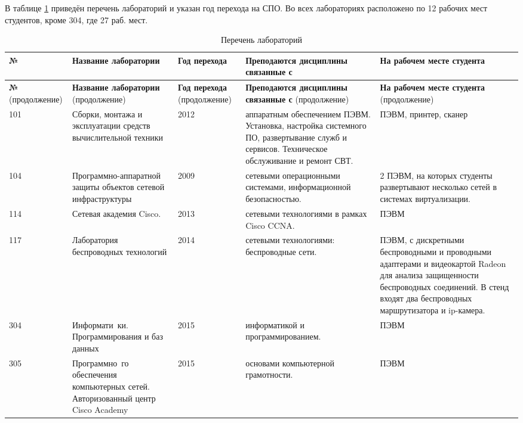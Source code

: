 \documentclass[10pt, a5paper]{article}
\begin{document}
В таблице \ref{Uymin1} приведён перечень лабораторий и указан год перехода на СПО. Во всех лабораториях расположено по 12 рабочих мест студентов, кроме 304, где 27 раб. мест.


\begin{longtable}[h!]{|p{0.7cm}|p{2cm}|p{1cm}|p{2.5cm}|p{2.5cm}|}
\caption{Перечень лабораторий} \label{Uymin1} \\
\hline

\textbf{№} & \textbf{Название лаборатории} & \textbf{Год перехода} & \textbf{Преподаются дисциплины связанные с} & \textbf{На рабочем месте студента} \\
\hline
\endfirsthead %

\hline
\textbf{№} (продолжение) & \textbf{Название лаборатории} (продолжение) & \textbf{Год перехода} (продолжение) & \textbf{Преподаются дисциплины связанные с} (продолжение) & \textbf{На рабочем месте студента} (продолжение) \\
\hline
\endhead %

 101 & Сборки, монтажа и эксплуатации средств вычислительной техники &  2012 & аппаратным обеспечением ПЭВМ. Установка, настройка системного ПО, развертывание служб и сервисов. Техническое обслуживание и ремонт СВТ. & ПЭВМ, принтер, сканер \\ 
\hline 
 104 & Программно-аппаратной защиты объектов сетевой инфраструктуры & 2009 & сетевыми операционными системами, информационной безопасностью. &  2 ПЭВМ, на которых студенты развертывают несколько сетей в системах виртуализации. \\ 
\hline 
 114 & Сетевая академия Cisco. & 2013 & сетевыми технологиями в рамках Cisco CCNA. &  ПЭВМ \\ 
\hline 
 117 & Лаборатория беспроводных технологий & 2014 & сетевыми технологиями: беспроводные сети. & ПЭВМ, с дискретными беспроводными и проводными адаптерами и видеокартой Radeon для анализа защищенности беспроводных соединений. В стенд входят два беспроводных маршрутизатора и ip-камера. \\
\hline 
 304 & Информати~\-ки. Программирования и баз данных &  2015 & информатикой и программированием. & ПЭВМ \\ 
\hline 
 305 & Программно~\-го обеспечения компьютерных сетей. Авторизованный центр Cisco Academy & 2015 & основами компьютерной грамотности. & ПЭВМ \\
\hline 

\end{longtable}
\end{document}
